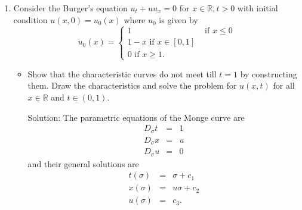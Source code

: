 \documentclass{article}
\theoremstyle{plain}
\numberwithin{thm}{section}
\theoremstyle{plain}
\numberwithin{prop}{section}
\theoremstyle{definition}
\numberwithin{defn}{section}
\theoremstyle{remark}
\numberwithin{equation}{section}
\begin{document}
\begin{enumerate}
\item Consider the Burger's equation $u_t + uu_x = 0$ for $x \in \mathbb{R}, t > 0$ with initial
condition $u(x, 0) = u_0(x)$ where $u_0$ is given by
\[
u_0(x) = \begin{cases}
1 & \text{ if } x \le 0 \\
1 - x \text{ if } x \in [0, 1] \\
0 \text{ if } x \ge 1.
\end{cases}
\]
\begin{itemize}
\item Show that the characteristic curves do not meet till $t = 1$ by constructing them. Draw the
characteristics and solve the problem for $u(x, t)$ for all $x \in \mathbb{R}$ and $t \in (0, 1)$.

\noindent Solution: The parametric equations of the Monge curve are
\begin{eqnarray}
D_\sigma t &=& 1 \\
D_\sigma x &=& u \\
D_\sigma u &=& 0 
\end{eqnarray}
and their general solutions are
\begin{eqnarray}
t(\sigma) &=& \sigma + c_1 \\
x(\sigma) &=& u\sigma + c_2 \\
u(\sigma) &=& c_3.
\end{eqnarray}


\end{itemize}
\end{enumerate}
\end{document}
